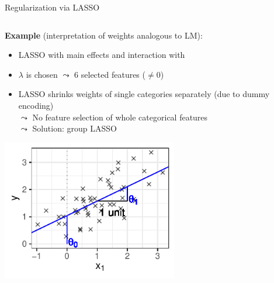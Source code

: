 \documentclass[11pt,compress,t,notes=noshow, aspectratio=169, xcolor=table]{beamer}
\begin{document}
\begin{frame}{Regularization via LASSO }

\begin{columns}[T, totalwidth=\linewidth]
\begin{column}{0.65\textwidth}
\textbf{Example} (interpretation of weights analogous to LM):
\begin{itemize}
    \item LASSO with main effects and interaction  with 
    \item $\lambda$ is chosen $\leadsto$ 6 selected features ($\neq 0$)
    \item LASSO shrinks weights of single categories separately (due to dummy encoding)\\
    $\leadsto$ No feature selection of whole categorical features\\
    $\leadsto$ Solution: group LASSO 
\end{itemize}
\smallskip
\centering
\includegraphics[width = 0.6\textwidth]{figure/reg_lm_plot_interpreted.pdf}

\end{column}
\begin{column}{0.35\textwidth}


\end{column}
\end{columns}
\end{frame}
\end{document}
